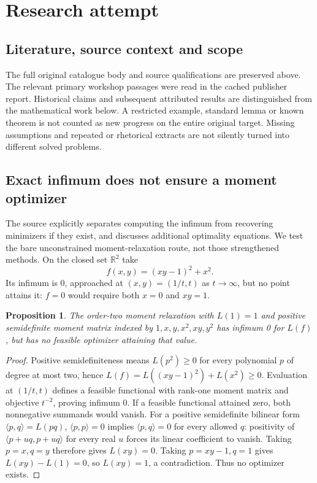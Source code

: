 \documentclass[11pt]{article}
\newtheorem{proposition}{Proposition}
\begin{document}
\section{Research attempt}
\subsection{Literature, source context and scope}
The full original catalogue body and source qualifications are preserved above. The relevant primary workshop passages were read in the cached publisher report. Historical claims and subsequent attributed results are distinguished from the mathematical work below. A restricted example, standard lemma or known theorem is not counted as new progress on the entire original target. Missing assumptions and repeated or rhetorical extracts are not silently turned into different solved problems.

\subsection{Exact infimum does not ensure a moment optimizer}
The source explicitly separates computing the infimum from recovering minimizers if they exist, and discusses additional optimality equations. We test the bare unconstrained moment-relaxation route, not those strengthened methods. On the closed set $\mathbb R^2$ take
\[
f(x,y)=(xy-1)^2+x^2.
\]
Its infimum is 0, approached at $(x,y)=(1/t,t)$ as $t\to\infty$, but no point attains it: $f=0$ would require both $x=0$ and $xy=1$.
\begin{proposition}
The order-two moment relaxation with $L(1)=1$ and positive semidefinite moment matrix indexed by $1,x,y,x^2,xy,y^2$ has infimum 0 for $L(f)$, but has no feasible optimizer attaining that value.
\end{proposition}
\begin{proof}
Positive semidefiniteness means $L(p^2)\ge0$ for every polynomial $p$ of degree at most two, hence $L(f)=L((xy-1)^2)+L(x^2)\ge0$. Evaluation at $(1/t,t)$ defines a feasible functional with rank-one moment matrix and objective $t^{-2}$, proving infimum 0.
If a feasible functional attained zero, both nonnegative summands would vanish. For a positive semidefinite bilinear form $\langle p,q\rangle=L(pq)$, $\langle p,p\rangle=0$ implies $\langle p,q\rangle=0$ for every allowed $q$: positivity of $\langle p+uq,p+uq\rangle$ for every real $u$ forces its linear coefficient to vanish. Taking $p=x,q=y$ therefore gives $L(xy)=0$. Taking $p=xy-1,q=1$ gives $L(xy)-L(1)=0$, so $L(xy)=1$, a contradiction. Thus no optimizer exists.
\end{proof}
\end{document}
